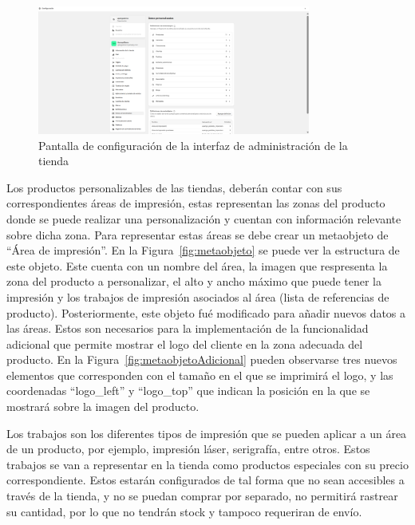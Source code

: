 \documentclass[12pt]{article}
\begin{document}
\begin{figure}[ht]
    \centering
    \includegraphics[width=0.8\textwidth]{imagenesUS2/configuracionAdministradorTienda.png}
    \caption{\label{fig:configuracionMetafields}Pantalla de configuración de la interfaz de administración de la tienda}
    \vspace{\fill}
\end{figure}

Los productos personalizables de las tiendas, deberán contar con sus correspondientes áreas de impresión, estas representan
las zonas del producto donde se puede realizar una personalización y cuentan con información relevante sobre dicha zona.
Para representar estas áreas se debe crear un metaobjeto de ``Área de impresión''. En la Figura~\ref{fig:metaobjeto} se puede ver la estructura de este 
objeto. Este cuenta con un nombre del área, la imagen que respresenta la zona del producto a personalizar, el alto y ancho máximo que puede tener la impresión y 
los trabajos de impresión asociados al área (lista de referencias de producto). Posteriormente, este objeto fué modificado para añadir nuevos datos a las áreas. Estos son necesarios
para la implementación de la funcionalidad adicional que permite mostrar el logo del cliente en la zona adecuada del producto. 
En la Figura~\ref{fig:metaobjetoAdicional} pueden observarse tres nuevos elementos que corresponden con el tamaño en el que se imprimirá el logo, y las coordenadas ``logo\_left'' 
y ``logo\_top'' que indican la posición en la que se mostrará sobre la imagen del producto.

Los trabajos son los diferentes tipos de impresión que se pueden aplicar a un área de un producto, por ejemplo, impresión láser, serigrafía, entre otros.
Estos trabajos se van a representar en la tienda como productos especiales con su precio correspondiente. Estos estarán configurados de tal forma que no sean accesibles a través de la tienda, y
no se puedan comprar por separado, no permitirá rastrear su cantidad, por lo que no tendrán stock y tampoco requeriran de envío.
\end{document}
